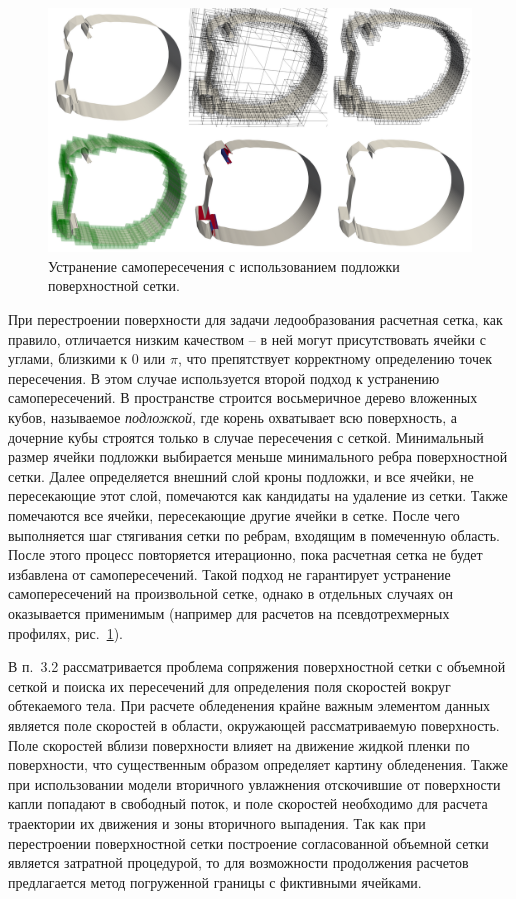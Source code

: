 \documentclass[a4paper,14pt]{extarticle}                     %
\theoremstyle{plain}                                         %
\begin{document}
\begin{figure}[!ht]
\centering
\includegraphics[width=1.0\textwidth]{./pics/text_1_int/wing_all.png}
\singlespacing
\caption{Устранение самопересечения с использованием подложки поверхностной сетки.}
\label{fig:text_1_int_2}
\end{figure}

При перестроении поверхности для задачи ледообразования расчетная сетка, как правило, отличается низким качеством -- в ней могут присутствовать ячейки с углами, близкими к $0$ или $\pi$, что препятствует корректному определению точек пересечения.
В этом случае используется второй подход к устранению самопересечений.
В пространстве строится восьмеричное дерево вложенных кубов, называемое \textit{подложкой}, где корень охватывает всю поверхность, а дочерние кубы строятся только в случае пересечения с сеткой.
Минимальный размер ячейки подложки выбирается меньше минимального ребра поверхностной сетки.
Далее определяется внешний слой кроны подложки, и все ячейки, не пересекающие этот слой, помечаются как кандидаты на удаление из сетки.
Также помечаются все ячейки, пересекающие другие ячейки в сетке.
После чего выполняется шаг стягивания сетки по ребрам, входящим в помеченную область.
После этого процесс повторяется итерационно, пока расчетная сетка не будет избавлена от самопересечений.
Такой подход не гарантирует устранение самопересечений на произвольной сетке, однако в отдельных случаях он оказывается применимым (например для расчетов на псевдотрехмерных профилях, рис.~\ref{fig:text_1_int_2}).


В п.~3.2 рассматривается проблема сопряжения поверхностной сетки с объемной сеткой и поиска их пересечений для определения поля скоростей вокруг обтекаемого тела.
При расчете обледенения крайне важным элементом данных является поле скоростей в области, окружающей рассматриваемую поверхность.
Поле скоростей вблизи поверхности влияет на движение жидкой пленки по поверхности, что существенным образом определяет картину обледенения.
Также при использовании модели вторичного увлажнения отскочившие от поверхности капли попадают в свободный поток, и поле скоростей необходимо для расчета траектории их движения и зоны вторичного выпадения.
Так как при перестроении поверхностной сетки построение согласованной объемной сетки является затратной процедурой, то для возможности продолжения расчетов предлагается метод погруженной границы с фиктивными ячейками.
\end{document}
